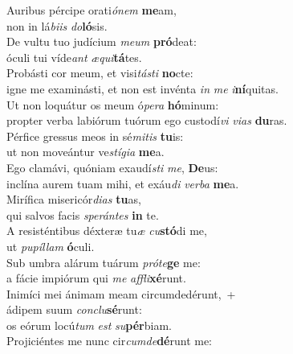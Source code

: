 \evenverse Auribus pércipe orati\textit{ó}\textit{nem} \textbf{me}am,~\*\\
\evenverse non in lá\textit{bi}\textit{is} \textit{do}\textbf{ló}sis.\\
\oddverse De vultu tuo judícium \textit{me}\textit{um} \textbf{pró}deat:~\*\\
\oddverse óculi tui víde\textit{ant} \textit{æ}\textit{qui}\textbf{tá}tes.\\
\evenverse Probásti cor meum, et visi\textit{tá}\textit{sti} \textbf{no}cte:~\*\\
\evenverse igne me examinásti, et non est invénta \textit{in} \textit{me} \textit{i}\textbf{ní}quitas.\\
\oddverse Ut non loquátur os meum ó\textit{pe}\textit{ra} \textbf{hó}minum:~\*\\
\oddverse propter verba labiórum tuórum ego custodí\textit{vi} \textit{vi}\textit{as} \textbf{du}ras.\\
\evenverse Pérfice gressus meos in sé\textit{mi}\textit{tis} \textbf{tu}is:~\*\\
\evenverse ut non moveántur ve\textit{stí}\textit{gi}\textit{a} \textbf{me}a.\\
\oddverse Ego clamávi, quóniam exaudí\textit{sti} \textit{me}, \textbf{De}us:~\*\\
\oddverse inclína aurem tuam mihi, et exáu\textit{di} \textit{ver}\textit{ba} \textbf{me}a.\\
\evenverse Mirífica misericór\textit{di}\textit{as} \textbf{tu}as,~\*\\
\evenverse qui salvos facis \textit{spe}\textit{rán}\textit{tes} \textbf{in} te.\\
\oddverse A resisténtibus déxteræ tu\textit{æ} \textit{cu}\textbf{stó}di me,~\*\\
\oddverse ut \textit{pu}\textit{píl}\textit{lam} \textbf{ó}culi.\\
\evenverse Sub umbra alárum tuárum \textit{pró}\textit{te}\textbf{ge} me:~\*\\
\evenverse a fácie impiórum qui \textit{me} \textit{af}\textit{fli}\textbf{xé}runt.\\
\oddverse Inimíci mei ánimam meam circumdedérunt,~+\\
\oddverse  ádipem suum \textit{con}\textit{clu}\textbf{sé}runt:~\*\\
\oddverse os eórum locú\textit{tum} \textit{est} \textit{su}\textbf{pér}biam.\\
\evenverse Projiciéntes me nunc cir\textit{cum}\textit{de}\textbf{dé}runt me:~\*\\
